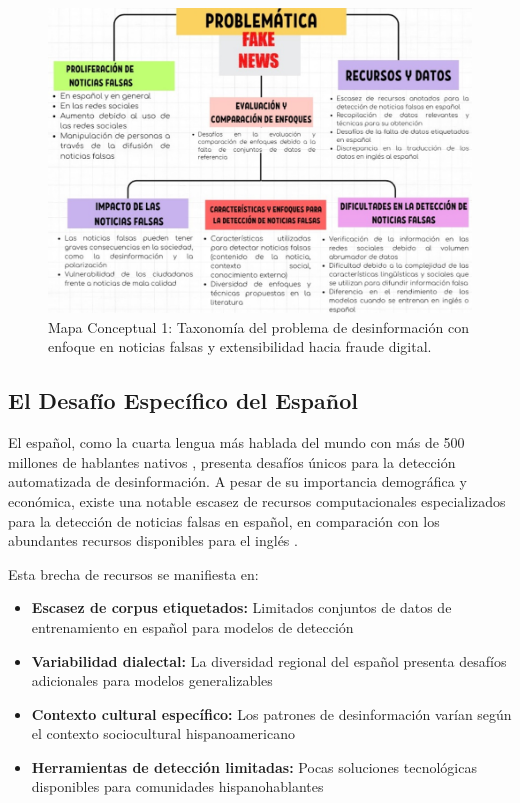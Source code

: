 \begin{figure}[h!]
    \centering
    \includegraphics[width=\textwidth]{Imagenes/mapaConceptual1.png}
    \caption{Mapa Conceptual 1: Taxonomía del problema de desinformación con enfoque en noticias falsas y extensibilidad hacia fraude digital.}
    \label{fig:mapa_problema}
\end{figure}

\subsection{El Desafío Específico del Español}

El español, como la cuarta lengua más hablada del mundo con más de 500 millones de hablantes nativos \cite{acosta2019construccion}, presenta desafíos únicos para la detección automatizada de desinformación. A pesar de su importancia demográfica y económica, existe una notable escasez de recursos computacionales especializados para la detección de noticias falsas en español, en comparación con los abundantes recursos disponibles para el inglés \cite{posadas2019detection}.

Esta brecha de recursos se manifiesta en:
\begin{itemize}
    \item \textbf{Escasez de corpus etiquetados:} Limitados conjuntos de datos de entrenamiento en español para modelos de detección
    \item \textbf{Variabilidad dialectal:} La diversidad regional del español presenta desafíos adicionales para modelos generalizables
    \item \textbf{Contexto cultural específico:} Los patrones de desinformación varían según el contexto sociocultural hispanoamericano
    \item \textbf{Herramientas de detección limitadas:} Pocas soluciones tecnológicas disponibles para comunidades hispanohablantes
\end{itemize}


